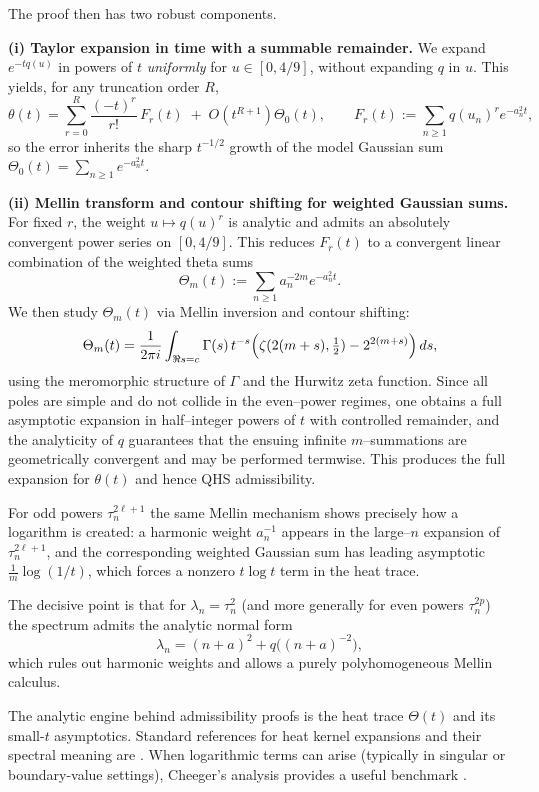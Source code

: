 \documentclass[11pt,letterpaper]{amsart}
\numberwithin{equation}{section}
\theoremstyle{definition}
\begin{document}
The proof then has two robust components.

\smallskip
\noindent\textbf{(i) Taylor expansion in time with a summable remainder.}
We expand $e^{-tq(u)}$ in powers of $t$ \emph{uniformly} for $u\in[0,4/9]$,
without expanding $q$ in $u$.  This yields, for any truncation order $R$,
\[
\theta(t)=\sum_{r=0}^R \frac{(-t)^r}{r!}\,F_r(t) \;+\; O(t^{R+1})\Theta_0(t),
\qquad
F_r(t):=\sum_{n\ge1}q(u_n)^r e^{-a_n^2 t},
\]
so the error inherits the sharp $t^{-1/2}$ growth of the model Gaussian sum
$\Theta_0(t)=\sum_{n\ge1}e^{-a_n^2 t}$.

\smallskip
\noindent\textbf{(ii) Mellin transform and contour shifting for weighted Gaussian sums.}
For fixed $r$, the weight $u\mapsto q(u)^r$ is analytic and admits an absolutely convergent power series on $[0,4/9]$. This reduces $F_r(t)$ to a convergent linear combination of the weighted theta sums
\[
\Theta_m(t):=\sum_{n\ge1}a_n^{-2m}e^{-a_n^2 t}.
\]
We then study $\Theta_m(t)$ via Mellin inversion and contour shifting:
\[
\Theta_m(t)=\frac{1}{2\pi i}\int_{\Re s=c}\Gamma(s)\,t^{-s}
\Bigl(\zeta(2(m+s),\tfrac12)-2^{2(m+s)}\Bigr)\,ds,
\]
using the meromorphic structure of $\Gamma$ and the Hurwitz zeta function.
Since all poles are simple and do not collide in the even--power regimes, one obtains a
full asymptotic expansion in half--integer powers of $t$ with controlled remainder,
and the analyticity of $q$ guarantees that the ensuing infinite $m$--summations are
geometrically convergent and may be performed termwise.  This produces the full expansion
for $\theta(t)$ and hence QHS admissibility.

For odd powers $\tau_n^{2\ell+1}$ the same Mellin mechanism shows precisely how a logarithm is created:
a harmonic weight $a_n^{-1}$ appears in the large--$n$ expansion of $\tau_n^{2\ell+1}$,
and the corresponding weighted Gaussian sum has leading asymptotic $\frac1m\log(1/t)$, which forces
a nonzero $t\log t$ term in the heat trace.

The decisive point is that for $\lambda_n=\tau_n^2$ (and more generally for
even powers $\tau_n^{2p}$) the spectrum admits the analytic normal form
\[
\lambda_n=(n+a)^2+q\bigl((n+a)^{-2}\bigr),
\]
which rules out harmonic weights and allows a purely polyhomogeneous Mellin calculus.


The analytic engine behind admissibility proofs is the heat trace
$\Theta(t)$ and its small-$t$ asymptotics.
Standard references for heat kernel expansions and their spectral meaning are
\cite{Gilkey95,BerlineGetzlerVergne1992_HeatKernelsDirac,Vassilevich2003_HeatKernelUsersManual}.
When logarithmic terms can arise (typically in singular or boundary-value settings),
Cheeger's analysis provides a useful benchmark \cite{Cheeger83}.
\end{document}
